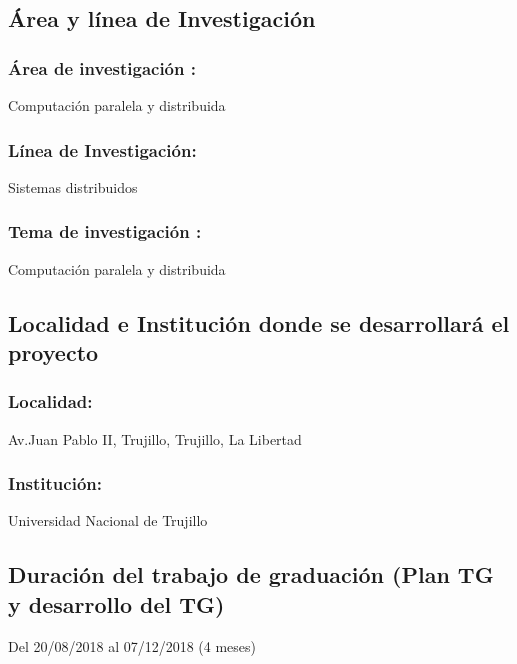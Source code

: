 \subsection{Área y línea de Investigación}
    \subsubsection{Área de investigación :} 
    Computación paralela y distribuida
    
    \subsubsection{Línea de Investigación:} 
    Sistemas distribuidos
                
    \subsubsection{Tema de investigación :}
    Computación paralela y distribuida


\subsection{Localidad e Institución donde se desarrollará el proyecto }
  
    \subsubsection{Localidad:} 
    Av.Juan Pablo II, Trujillo, Trujillo, La Libertad

    \subsubsection{Institución:}
    Universidad Nacional de Trujillo

\subsection{Duración del trabajo de graduación (Plan TG y desarrollo del TG)}
Del 20/08/2018 al 07/12/2018 (4 meses)

\newpage

